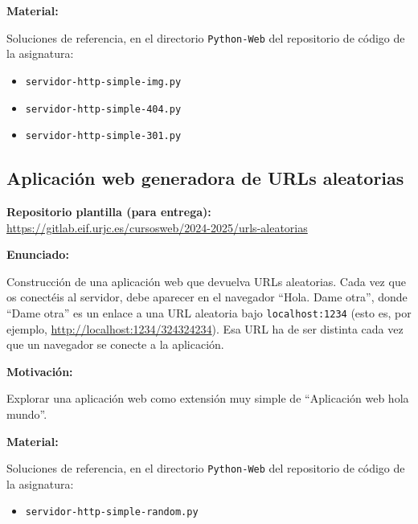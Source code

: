 \textbf{Material:}

Soluciones de referencia, en el directorio \verb|Python-Web| del repositorio de código de la asignatura:


\begin{itemize}
\item \verb|servidor-http-simple-img.py|
\item \verb|servidor-http-simple-404.py|
\item \verb|servidor-http-simple-301.py|
\end{itemize}

\subsection{Aplicación web generadora de URLs aleatorias}
\label{subsec:aplweb-urls-aleatorias}

\textbf{Repositorio plantilla (para entrega):} \\
\url{https://gitlab.eif.urjc.es/cursosweb/2024-2025/urls-aleatorias}

\textbf{Enunciado:}

Construcción de una aplicación web que devuelva URLs aleatorias. Cada vez que os conectéis al servidor, debe aparecer en el navegador ``Hola. Dame otra'', donde ``Dame otra'' es un enlace a una URL aleatoria bajo \verb|localhost:1234| (esto es, por ejemplo, \url{http://localhost:1234/324324234}). Esa URL ha de ser distinta cada vez que un navegador se conecte a la aplicación.


\textbf{Motivación:}

Explorar una aplicación web como extensión muy simple de ``Aplicación web hola mundo''.

\textbf{Material:}

Soluciones de referencia, en el directorio \verb|Python-Web| del repositorio de código de la asignatura:


\begin{itemize}
\item \verb|servidor-http-simple-random.py|
\end{itemize}

